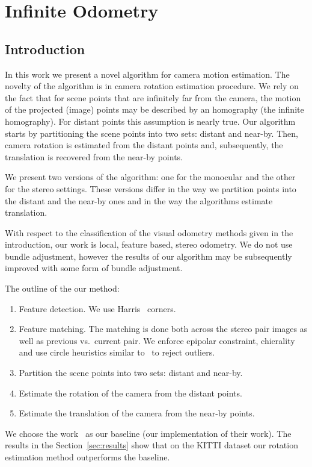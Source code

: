 \chapter{Infinite Odometry}

\section{Introduction}
In this work we present a novel algorithm for camera motion
estimation.  The novelty of the algorithm is in camera rotation
estimation procedure.  We rely on the fact that for scene points that
are infinitely far from the camera, the motion of the projected
(image) points may be described by an homography (the infinite
homography). For distant points this assumption is nearly true.  Our
algorithm starts by partitioning the scene points into two sets:
distant and near-by. Then, camera rotation is estimated from the
distant points and, subsequently, the translation is recovered from
the near-by points.

We present two versions of the algorithm: one for the monocular and
the other for the stereo settings.  These versions differ in the way
we partition points into the distant and the near-by ones and in the
way the algorithms estimate translation.

With respect to the classification of the visual odometry methods
given in the introduction, our work is local, feature based, stereo
odometry.  We do not use bundle adjustment, however the results of our
algorithm may be subsequently improved with some form of bundle
adjustment.

The outline of the our method:
\begin{enumerate}
\item Feature detection.  We use Harris~\cite{Harris1987} corners.
\item Feature matching. The matching is done both across the stereo
  pair images as well as previous vs.\ current pair.  We enforce
  epipolar constraint, chierality and use circle heuristics similar
  to~\cite{Geiger2011} to reject outliers.
\item Partition the scene points into two sets: distant and near-by.
\item Estimate the rotation of the camera from the distant points.
\item Estimate the translation of the camera from the near-by points.
\end{enumerate}

We choose the work~\cite{Geiger2011} as our baseline (our
implementation of their work).  The results in the
Section~\ref{sec:results} show that on the KITTI dataset our rotation
estimation method outperforms the baseline.

